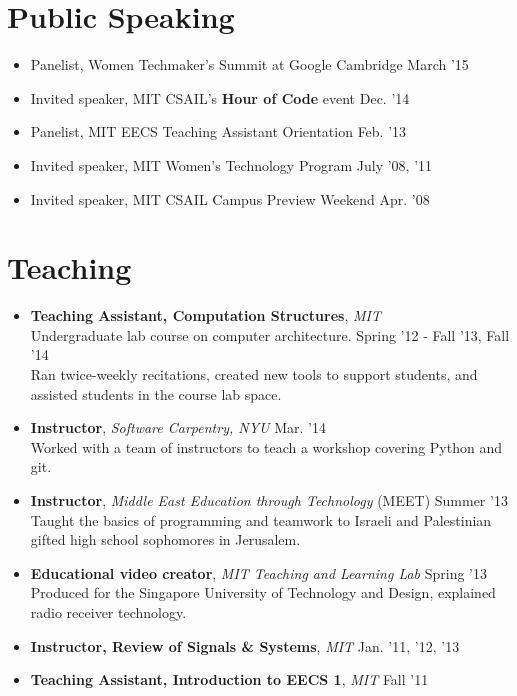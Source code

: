 \documentclass[margin]{res}
\begin{document}
\begin{resume}
\section{Public Speaking}
\begin{itemize}[leftmargin=*] \itemsep -2pt 
\item Panelist, Women Techmaker's Summit at Google Cambridge \hfill March '15
\item Invited speaker, MIT CSAIL's {\bf Hour of Code} event \hfill Dec. '14
\item Panelist, MIT EECS Teaching Assistant Orientation \hfill Feb. '13
\item Invited speaker, MIT Women's Technology Program \hfill July '08, '11
\item Invited speaker, MIT CSAIL Campus Preview Weekend \hfill Apr. '08
\end{itemize}


 
\section{Teaching}
\begin{itemize}[leftmargin=*] %
\item {\bf Teaching Assistant, Computation Structures}, {\it MIT} \\Undergraduate lab course on computer architecture. \hfill Spring '12 - Fall '13, Fall '14 \\Ran twice-weekly recitations, created new tools to support students, and assisted students in the course lab space.  
\item {\bf Instructor}, {\it Software Carpentry, NYU} \hfill Mar. '14  
\\Worked with a team of instructors to teach a workshop covering Python and git.
\item {\bf Instructor}, {\it Middle East Education through Technology} (MEET) \hfill Summer '13 \\ Taught the basics of programming and teamwork to Israeli and Palestinian gifted high school sophomores in Jerusalem.
\item {\bf Educational video creator}, {\it MIT Teaching and Learning Lab} \hfill Spring '13 \\
Produced for the Singapore University of Technology and Design, explained radio receiver technology.
\item {\bf Instructor, Review of Signals \& Systems}, {\it MIT} \hfill Jan. '11, '12, '13 %
\item {\bf Teaching Assistant, Introduction to EECS 1}, {\it MIT} \hfill Fall '11 %


\end{itemize}
\end{resume}
\end{document}
